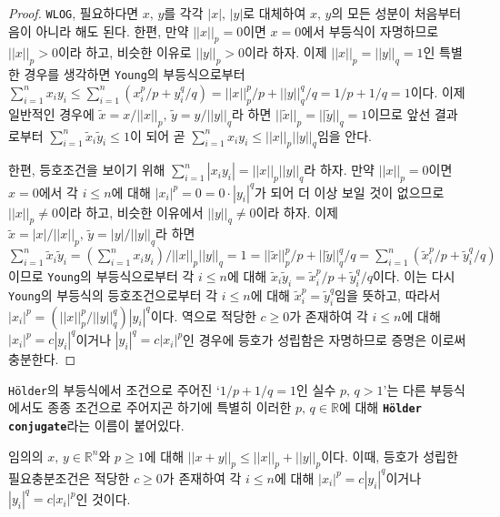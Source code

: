 \begin{proof}
    \texttt{WLOG}, 필요하다면 $x,\,y$를 각각 $|x|,\,|y|$로 대체하여 $x,\,y$의 모든 성분이 처음부터 음이 아니라 해도 된다. 한편, 만약 $||x||_p=0$이면 $x=0$에서 부등식이 자명하므로 $||x||_p>0$이라 하고, 비슷한 이유로 $||y||_p>0$이라 하자. 이제 $||x||_p=||y||_q=1$인 특별한 경우를 생각하면 \texttt{Young}의 부등식으로부터 $\sum_{i=1}^nx_iy_i\leq\sum_{i=1}^n(x_i^p/p+y_i^q/q)=||x||_p^p/p+||y||_q^q/q=1/p+1/q=1$이다. 이제 일반적인 경우에 $\widetilde{x}=x/||x||_p,\,\widetilde{y}=y/||y||_q$라 하면 $||\widetilde{x}||_p=||\widetilde{y}||_q=1$이므로 앞선 결과로부터 $\sum_{i=1}^n\widetilde{x}_i\widetilde{y}_i\leq1$이 되어 곧 $\sum_{i=1}^nx_iy_i\leq||x||_p||y||_q$임을 안다.

    한편, 등호조건을 보이기 위해 $\sum_{i=1}^n|x_iy_i|=||x||_p||y||_q$라 하자. 만약 $||x||_p=0$이면 $x=0$에서 각 $i\leq n$에 대해 $|x_i|^p=0=0\cdot|y_i|^q$가 되어 더 이상 보일 것이 없으므로 $||x||_p\ne0$이라 하고, 비슷한 이유에서 $||y||_q\ne0$이라 하자. 이제 $\widetilde{x}=|x|/||x||_p,\,\widetilde{y}=|y|/||y||_q$라 하면 $\sum_{i=1}^n\widetilde{x}_i\widetilde{y}_i=(\sum_{i=1}^nx_iy_i)/||x||_p||y||_q=1=||\widetilde{x}||_p^p/p+||\widetilde{y}||_q^q/q=\sum_{i=1}^n(\widetilde{x}_i^p/p+\widetilde{y}_i^q/q)$이므로 \texttt{Young}의 부등식으로부터 각 $i\leq n$에 대해 $\widetilde{x}_i\widetilde{y}_i=\widetilde{x}_i^p/p+\widetilde{y}_i^q/q$이다. 이는 다시 \texttt{Young}의 부등식의 등호조건으로부터 각 $i\leq n$에 대해 $\widetilde{x}_i^p=\widetilde{y}_i^q$임을 뜻하고, 따라서 $|x_i|^p=(||x||_p^p/||y||_q^q)|y_i|^q$이다. 역으로 적당한 $c\geq0$가 존재하여 각 $i\leq n$에 대해 $|x_i|^p=c|y_i|^q$이거나 $|y_i|^q=c|x_i|^p$인 경우에 등호가 성립함은 자명하므로 증명은 이로써 충분한다.
\end{proof}

\texttt{H\"older}의 부등식에서 조건으로 주어진 `$1/p+1/q=1$인 실수 $p,\,q>1$'는 다른 부등식에서도 종종 조건으로 주어지곤 하기에 특별히 이러한 $p,\,q\in\mathbb{R}$에 대해 \textbf{\texttt{H\"older conjugate}}라는 이름이 붙어있다.

\begin{theorem}
    임의의 $x,\,y\in\mathbb{R}^n$와 $p\geq1$에 대해 $||x+y||_p\leq||x||_p+||y||_p$이다. 이때, 등호가 성립한 필요충분조건은 적당한 $c\geq0$가 존재하여 각 $i\leq n$에 대해 $|x_i|^p=c|y_i|^q$이거나 $|y_i|^q=c|x_i|^p$인 것이다.
\end{theorem}

